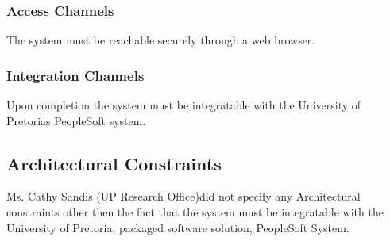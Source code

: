 \documentclass[12pt]{article}
\newcommand{\client}{Ms. Cathy Sandis (UP Research Office)}
\begin{document}
\subsubsection{Access Channels}
The system must be reachable securely through a web browser. 

\subsubsection{Integration Channels}
Upon completion the system must be integratable with the University of Pretorias PeopleSoft system.

\subsection{Architectural Constraints}
\client did not specify any Architectural constraints other then the fact that the system must be integratable with the University of Pretoria, packaged software solution, PeopleSoft System. 

\end{document}
